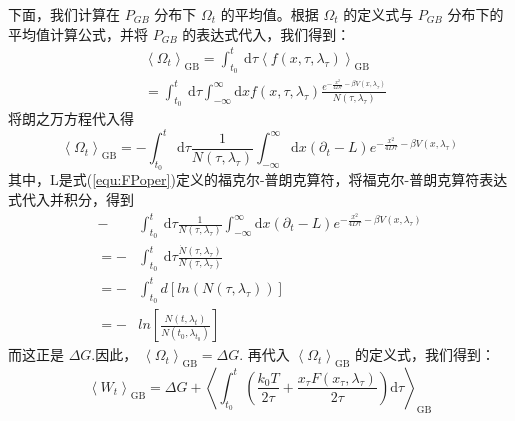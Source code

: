 下面，我们计算在  $P_{GB}$  分布下  $\Omega_{t}$  的平均值。根据  $\Omega_{t}$  的定义式与  $P_{GB}$  分布下的平均值计算公式，并将  $P_{GB}$  的表达式代入，我们得到：
\begin{equation}
\begin{aligned}
&\left\langle\Omega_{t}\right\rangle_{\mathrm{GB}}=\int_{t_{0}}^{t} \mathrm{~d} \tau\left\langle f\left(x, \tau, \lambda_{\tau}\right)\right\rangle_{\mathrm{GB}} \\
&=\int_{t_{0}}^{t} \mathrm{~d} \tau \int_{-\infty}^{\infty} \mathrm{d} x f\left(x, \tau, \lambda_{\tau}\right) \frac{e^{-\frac{x^{2}}{4 D \tau}-\beta V\left(x, \lambda_{\tau}\right)}}{N\left(\tau, \lambda_{\tau}\right)}
\end{aligned}
\end{equation}
将朗之万方程代入得
$$
\left\langle\Omega_{t}\right\rangle_{\mathrm{GB}}=-\int_{t_{0}}^{t} \mathrm{~d} \tau \frac{1}{N\left(\tau, \lambda_{\tau}\right)} \int_{-\infty}^{\infty} \mathrm{d} x\left(\partial_{t}-L\right) e^{-\frac{x^{2}}{4 D \tau}-\beta V\left(x, \lambda_{\tau}\right)}
$$
其中，L是式(\ref{equ:FPoper})定义的福克尔-普朗克算符，将福克尔-普朗克算符表达式代入并积分，得到
\begin{equation}
\begin{aligned}
-&\int_{t_{0}}^{t} \mathrm{~d} \tau \frac{1}{N\left(\tau, \lambda_{\tau}\right)} \int_{-\infty}^{\infty} \mathrm{d} x\left(\partial_{t}-L\right) e^{-\frac{x^{2}}{4 D \tau}-\beta V\left(x, \lambda_{\tau}\right)}\\
=-&\int_{t_{0}}^{t} \mathrm{~d} \tau \frac{\dot{N}\left(\tau, \lambda_{\tau}\right)}{N\left(\tau, \lambda_{\tau}\right)}\\
=-&\int_{t_{0}}^{t} d[ln(N\left(\tau, \lambda_{\tau}\right))]\\
=-&ln\left[\frac{N\left(t, \lambda_{t}\right)}{N\left(t_{0}, \lambda_{t_{0}}\right)}\right]
\end{aligned}
\end{equation}
而这正是  $\Delta G$.因此，  $\left\langle\Omega_ {t}\right\rangle_{\mathrm{GB}}=\Delta G$.  再代入  $\left\langle\Omega_ {t}\right\rangle_{\mathrm{GB}}$  的定义式，我们得到：
\begin{equation}
\left\langle W_{t}\right\rangle_{\mathrm{GB}}=\Delta G+\left\langle\int_{t_{0}}^{t}\left(\frac{k_{0} T}{2 \tau}+\frac{x_{\tau} F\left(x_{\tau}, \lambda_{\tau}\right)}{2 \tau}\right) \mathrm{d} \tau\right\rangle_{\mathrm{GB}}
\end{equation}

